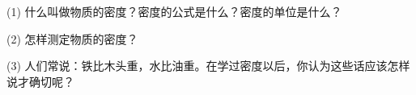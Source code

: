\label{sec:4-fuxi}

(1) 什么叫做物质的密度？密度的公式是什么？密度的单位是什么？

(2) 怎样测定物质的密度？

(3) 人们常说：铁比木头重，水比油重。在学过密度以后，你认为这些话应该怎样说才确切呢？

